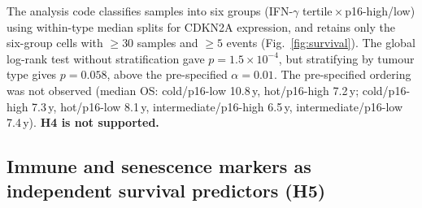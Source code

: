 \documentclass[10pt,twocolumn]{article}
\begin{document}
The analysis code classifies samples into six groups (IFN-$\gamma$
tertile\,$\times$\,p16-high/low) using within-type median splits for CDKN2A
expression, and retains only the six-group cells with $\geq30$ samples
and $\geq5$ events (Fig.~\ref{fig:survival}). The global log-rank test
without stratification gave $p=1.5\times10^{-4}$, but stratifying by tumour
type gives $p=0.058$, above the pre-specified $\alpha=0.01$. The pre-specified
ordering was not observed (median OS: cold/p16-low 10.8\,y, hot/p16-high
7.2\,y; cold/p16-high 7.3\,y, hot/p16-low 8.1\,y, intermediate/p16-high
6.5\,y, intermediate/p16-low 7.4\,y). \textbf{H4 is not supported.}

\subsection{Immune and senescence markers as independent survival
predictors (H5)}
\end{document}
